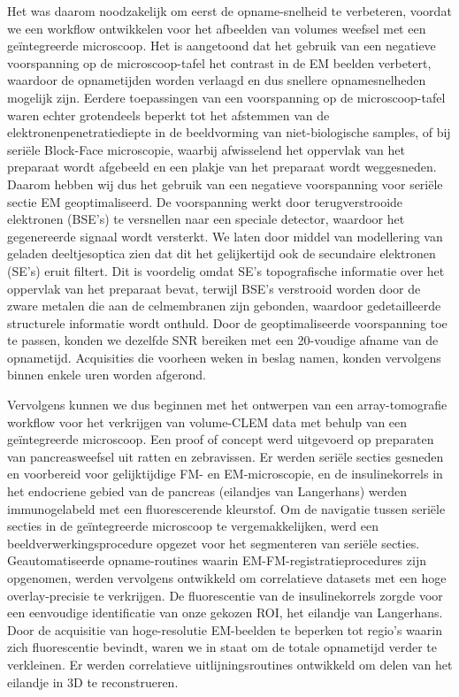 Het was daarom noodzakelijk om eerst de opname-snelheid te verbeteren, voordat we een workflow ontwikkelen voor het afbeelden van volumes weefsel met een geïntegreerde microscoop. Het is aangetoond dat het gebruik van een negatieve voorspanning op de microscoop-tafel het contrast in de EM beelden verbetert, waardoor de opnametijden worden verlaagd en dus snellere opnamesnelheden mogelijk zijn. Eerdere toepassingen van een voorspanning op de microscoop-tafel waren echter grotendeels beperkt tot het afstemmen van de elektronen\-penetratie\-diepte in de beeldvorming van niet-biologische samples, of bij seriële Block-Face microscopie, waarbij afwisselend het oppervlak van het preparaat wordt afgebeeld en een plakje van het preparaat wordt weggesneden. Daarom hebben wij dus het gebruik van een negatieve voorspanning voor seriële sectie EM geoptimaliseerd. De voorspanning werkt door terugverstrooide elektronen (BSE's) te versnellen naar een speciale detector, waardoor het gegenereerde signaal wordt versterkt. We laten door middel van modellering van geladen deeltjesoptica zien dat dit het gelijkertijd  ook de secundaire elektronen (SE's) eruit filtert. Dit is voordelig omdat SE's topografische informatie over het oppervlak van het preparaat bevat, terwijl BSE's verstrooid worden door de zware metalen die aan de celmembranen zijn gebonden, waardoor gedetailleerde structurele informatie wordt onthuld. Door de geoptimaliseerde voorspanning toe te passen, konden we dezelfde SNR bereiken met een 20-voudige afname van de opnametijd. Acquisities die voorheen weken in beslag namen, konden vervolgens binnen enkele uren worden afgerond.

Vervolgens kunnen we dus beginnen met het ontwerpen van een array-tomografie workflow voor het verkrijgen van volume-CLEM data met behulp van een geïntegreerde microscoop. Een proof of concept werd uitgevoerd op preparaten van pancreasweefsel uit ratten en zebravissen. Er werden seriële secties gesneden en voorbereid voor gelijktijdige FM- en EM-microscopie, en de insulinekorrels in het endocriene gebied van de pancreas (eilandjes van Langerhans) werden immunogelabeld met een fluorescerende kleurstof. Om de navigatie tussen seriële secties in de geïntegreerde microscoop te vergemakkelijken, werd een beeldverwerkingsprocedure opgezet voor het segmenteren van seriële secties. Geautomatiseerde opname-routines waarin EM-FM-registratieprocedures zijn opgenomen, werden vervolgens ontwikkeld om correlatieve datasets met een hoge overlay-precisie te verkrijgen. De fluorescentie van de insulinekorrels zorgde voor een eenvoudige identificatie van onze gekozen ROI, het eilandje van Langerhans. Door de acquisitie van hoge-resolutie EM-beelden te beperken tot regio's waarin zich fluorescentie bevindt, waren we in staat om de totale opnametijd verder te verkleinen. Er werden correlatieve uitlijningsroutines ontwikkeld om delen van het eilandje in 3D te reconstrueren.

